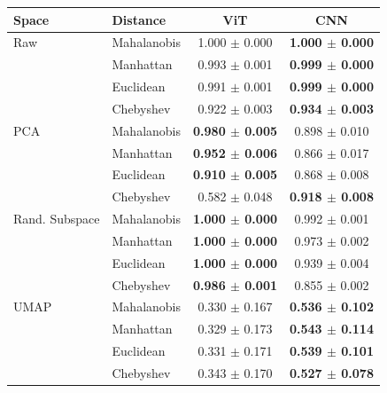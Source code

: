 \begin{tabular}{llcc}
\toprule
Space & Distance & ViT & CNN \\
\midrule
Raw & Mahalanobis & 1.000 $\pm$ 0.000 & \textbf{1.000 $\pm$ 0.000} \\
 & Manhattan & 0.993 $\pm$ 0.001 & \textbf{0.999 $\pm$ 0.000} \\
 & Euclidean & 0.991 $\pm$ 0.001 & \textbf{0.999 $\pm$ 0.000} \\
 & Chebyshev & 0.922 $\pm$ 0.003 & \textbf{0.934 $\pm$ 0.003} \\
\midrule
PCA & Mahalanobis & \textbf{0.980 $\pm$ 0.005} & 0.898 $\pm$ 0.010 \\
 & Manhattan & \textbf{0.952 $\pm$ 0.006} & 0.866 $\pm$ 0.017 \\
 & Euclidean & \textbf{0.910 $\pm$ 0.005} & 0.868 $\pm$ 0.008 \\
 & Chebyshev & 0.582 $\pm$ 0.048 & \textbf{0.918 $\pm$ 0.008} \\
\midrule
Rand. Subspace & Mahalanobis & \textbf{1.000 $\pm$ 0.000} & 0.992 $\pm$ 0.001 \\
 & Manhattan & \textbf{1.000 $\pm$ 0.000} & 0.973 $\pm$ 0.002 \\
 & Euclidean & \textbf{1.000 $\pm$ 0.000} & 0.939 $\pm$ 0.004 \\
 & Chebyshev & \textbf{0.986 $\pm$ 0.001} & 0.855 $\pm$ 0.002 \\
\midrule
UMAP & Mahalanobis & 0.330 $\pm$ 0.167 & \textbf{0.536 $\pm$ 0.102} \\
 & Manhattan & 0.329 $\pm$ 0.173 & \textbf{0.543 $\pm$ 0.114} \\
 & Euclidean & 0.331 $\pm$ 0.171 & \textbf{0.539 $\pm$ 0.101} \\
 & Chebyshev & 0.343 $\pm$ 0.170 & \textbf{0.527 $\pm$ 0.078} \\

\bottomrule
\end{tabular}